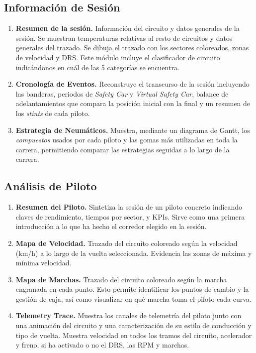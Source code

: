 \documentclass[12pt,a4paper,twoside,openright]{book}
\begin{document}
\begin{umaappendices}
\subsection{Información de Sesión}
\begin{enumerate}
  \item \textbf{Resumen de la sesión.} Información del circuito y datos generales de la sesión. Se muestran temperaturas relativas al resto de circuitos y datos generales del trazado. Se dibuja el trazado con los sectores coloreados, zonas de velocidad y DRS. Este módulo incluye el clasificador de circuito indicándonos en cuál de las 5 categorías se encuentra.
  \item \textbf{Cronología de Eventos.} Reconstruye el transcurso de la sesión incluyendo las banderas, periodos de \textit{Safety Car} y \textit{Virtual Safety Car}, balance de adelantamientos que compara la posición inicial con la final y un resumen de los \textit{stints} de cada piloto.
  \item \textbf{Estrategia de Neumáticos.}  Muestra, mediante un diagrama de Gantt, los \textit{compuestos} usados por cada piloto y las gomas más utilizadas en toda la carrera, permitiendo comparar las estrategias seguidas a lo largo de la carrera.
\end{enumerate}

\subsection{Análisis de Piloto}
\begin{enumerate}
  \item \textbf{Resumen del Piloto.} Sintetiza la sesión de un piloto concreto indicando claves de rendimiento, tiempos por sector, y KPIs. Sirve como una primera introducción a lo que ha hecho el corredor elegido en la sesión.
  \item \textbf{Mapa de Velocidad.} Trazado del circuito coloreado según la velocidad (km/h) a lo largo de la vuelta seleccionada. Evidencia las zonas de máxima y mínima velocidad.
  \item \textbf{Mapa de Marchas.} Trazado del circuito coloreado según la marcha engranada en cada punto. Esto permite identificar los puntos de cambio y la gestión de caja, así como visualizar en qué marcha toma el piloto cada curva.
  \item \textbf{Telemetry Trace.} Muestra los canales de telemetría del piloto junto con una animación del circuito y una caracterización de su estilo de conducción y tipo de vuelta. Muestra velocidad en todos los tramos del circuito, acelerador y freno, si ha activado o no el DRS, las RPM y marchas.
\end{enumerate}


\end{umaappendices}
\end{document}
